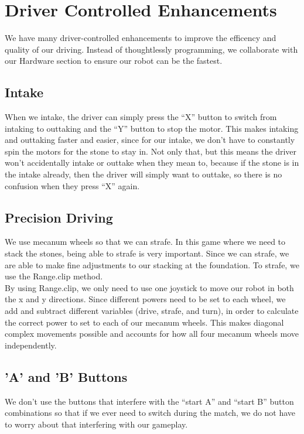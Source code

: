 \documentclass{article}
\begin{document}
\section{Driver Controlled Enhancements}

We have many driver-controlled enhancements to improve the efficency and quality of our driving. Instead of thoughtlessly programming, we collaborate with our Hardware section to ensure our robot can be the fastest.  

\subsection{Intake}
When we intake, the driver can simply press the “X” button to switch from intaking to outtaking and the “Y” button to stop the motor. This makes intaking and outtaking faster and easier, since for our intake, we don’t have to constantly spin the motors for the stone to stay in. Not only that, but this means the driver won’t accidentally intake or outtake when they mean to, because if the stone is in the intake already, then the driver will simply want to outtake, so there is no confusion when they press “X” again.


\subsection{Precision Driving}

We use mecanum wheels so that we can strafe. In this game where we need to stack the stones, being able to strafe is very important. Since we can strafe, we are able to make fine adjustments to our stacking at the foundation. To strafe, we use the Range.clip method. \\

By using Range.clip, we only need to use one joystick to move our robot in both the x and y directions. Since different powers need to be set to each wheel, we add and subtract different variables (drive, strafe, and turn), in order to calculate the correct power to set to each of our mecanum wheels. This makes diagonal complex movements possible and accounts for how all four mecanum wheels move independently.


\subsection{'A' and 'B' Buttons}

We don't use the buttons that interfere with the “start A” and “start B” button combinations so that if we ever need to switch during the match, we do not have to worry about that interfering with our gameplay.
\end{document}
